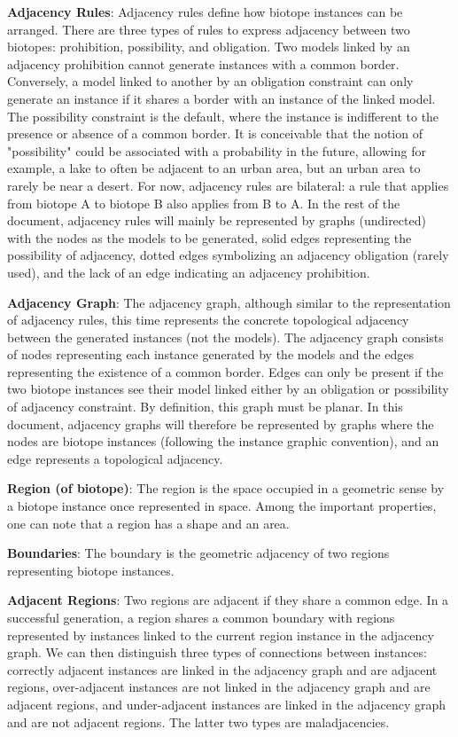 \textbf{Adjacency Rules}: Adjacency rules define how biotope instances can be arranged. There are three types of rules to express adjacency between two biotopes: prohibition, possibility, and obligation. Two models linked by an adjacency prohibition cannot generate instances with a common border. Conversely, a model linked to another by an obligation constraint can only generate an instance if it shares a border with an instance of the linked model. The possibility constraint is the default, where the instance is indifferent to the presence or absence of a common border. It is conceivable that the notion of "possibility" could be associated with a probability in the future, allowing for example, a lake to often be adjacent to an urban area, but an urban area to rarely be near a desert. For now, adjacency rules are bilateral: a rule that applies from biotope A to biotope B also applies from B to A. In the rest of the document, adjacency rules will mainly be represented by graphs (undirected) with the nodes as the models to be generated, solid edges representing the possibility of adjacency, dotted edges symbolizing an adjacency obligation (rarely used), and the lack of an edge indicating an adjacency prohibition.

\textbf{Adjacency Graph}: The adjacency graph, although similar to the representation of adjacency rules, this time represents the concrete topological adjacency between the generated instances (not the models). The adjacency graph consists of nodes representing each instance generated by the models and the edges representing the existence of a common border. Edges can only be present if the two biotope instances see their model linked either by an obligation or possibility of adjacency constraint. By definition, this graph must be planar. In this document, adjacency graphs will therefore be represented by graphs where the nodes are biotope instances (following the instance graphic convention), and an edge represents a topological adjacency.

\textbf{Region (of biotope)}: The region is the space occupied in a geometric sense by a biotope instance once represented in space. Among the important properties, one can note that a region has a shape and an area.

\textbf{Boundaries}: The boundary is the geometric adjacency of two regions representing biotope instances.

\textbf{Adjacent Regions}: Two regions are adjacent if they share a common edge. In a successful generation, a region shares a common boundary with regions represented by instances linked to the current region instance in the adjacency graph. We can then distinguish three types of connections between instances: correctly adjacent instances are linked in the adjacency graph and are adjacent regions, over-adjacent instances are not linked in the adjacency graph and are adjacent regions, and under-adjacent instances are linked in the adjacency graph and are not adjacent regions. The latter two types are maladjacencies.

